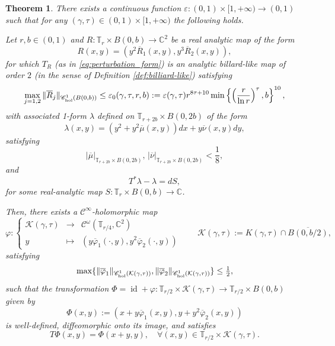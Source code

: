 \documentclass[10pt]{article}
\newtheorem{theorem}{Theorem}[section]
\DeclareMathOperator{\id}{id}
\newcommand{\C}{\mathbb{C}}
\newcommand{\T}{\mathbb{T}}
\begin{document}
\begin{theorem}
\label{thm:KAM}
There exists a continuous function $\varepsilon: (0,1) \times [1, +\infty) \to (0, 1)$ such that for any $(\gamma,\tau)\in(0,1)\times[1,+\infty)$ the following holds.

Let $r,b\in(0,1)$ and $R: \T_r \times B(0, b) \to \C^2$ be a real analytic map of the form
 \begin{equation}
 \label{eq:form_R}
 R(x, y) = (y^2 \overline R_1(x, y), y^3 \overline R_2(x, y)),
 \end{equation}
 for which $T_R$ (as in \eqref{eq:perturbation_form}) is an analytic billard-like map of order $2$ (in the sense of Definition \ref{def:billiard-like}) satisfying 
 \begin{equation}
 \label{eq:smallness_condition_R}
 \max_{j=1,2}
 \| \overline R_j \|_{\mathscr C^1_{\textup{hol}}(B(0,b))}
 \leq \varepsilon_0(\gamma,\tau,r,b) :=\varepsilon(\gamma,\tau)r^{8\tau+10}
 \min\left\{\left(\frac{r}{\ln r}\right)^{\tau},b\right\}^{10},
 \end{equation}
  with associated 1-form $\lambda$ defined on $\T_{r + 2b} \times B(0, 2b)$ of the form
\begin{equation}
\label{eq:form_form}
\lambda(x, y) = (y^2 + y^2\overline \mu(x, y))dx + y \overline \nu(x, y)dy, 
\end{equation}
satisfying
\begin{equation}
    \label{eq:smallness_condition_form}
    | \overline \mu|_{\T_{r + 2b} \times B(0, 2b)},\, | \overline \nu|_{\T_{r + 2b} \times B(0, 2b)} < \frac{1}{8},
\end{equation}
and 
\begin{equation}
    \label{eq:exact_symplectic}
    T^*\lambda - \lambda = dS,
\end{equation}
for some real-analytic map $S: \T_r \times B(0, b) \to \C$.

Then, there exists a $\mathscr{C}^{\infty}$-holomorphic map
\[
{\varphi}:
\left\{
\begin{array}{ccc}
\mathcal K(\gamma, \tau)
& \to &
\mathscr C^\omega(\T_{r/4}, \C^2)\\
y & \mapsto & (y\overline \varphi_1(\cdot,y),y^2\overline \varphi_2(\cdot,y))
\end{array}\right.
\qquad 
\mathcal K(\gamma, \tau):= K(\gamma, \tau)\cap \overline{B(0,b/2)},
\]
satisfying 
    \begin{equation*}
 \label{eq:bounds_curve_constants}
\max\{
\| \overline \varphi_1\|_{\mathscr C^1_{\textup{hol}}(\mathcal K(\gamma, \tau))},
\|\overline \varphi_2\|_{\mathscr C^1_{\textup{hol}}(\mathcal K(\gamma, \tau))}\}
\leq \tfrac{1}{2},
 \end{equation*}
such that the transformation $\Phi=\id +{\varphi}: \T_{r/2} \times \mathcal K(\gamma, \tau) \to \T_{r/2} \times B(0, b)$ given by
 \[
  \Phi(x,y) := (x+y\overline \varphi_1(x,y),y+y^2\overline \varphi_2(x,y))
 \]
is well-defined, diffeomorphic onto its image, and satisfies
\[
T\Phi(x,y) = \Phi(x+y,y),
\quad \forall (x,y)\in\T_{r/2}\times \mathcal K(\gamma, \tau).
\]
\end{theorem}
\end{document}
